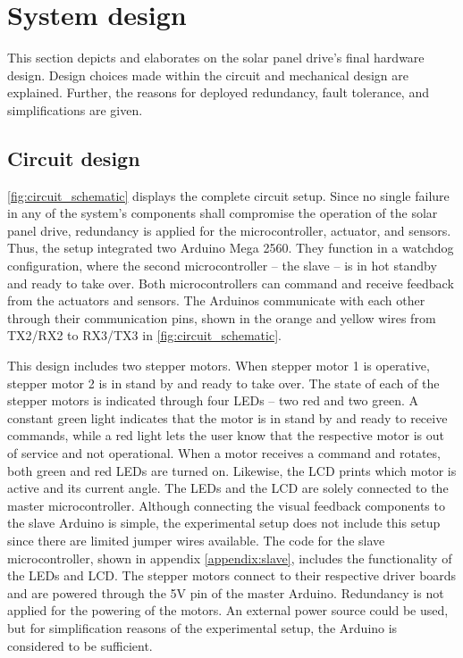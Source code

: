 \section{System design}
This section depicts and elaborates on the solar panel drive's final hardware design. Design choices made within the circuit and mechanical design are explained. Further, the reasons for deployed redundancy, fault tolerance, and simplifications are given.

\subsection{Circuit design}
\autoref{fig:circuit_schematic} displays the complete circuit setup.
Since no single failure in any of the system's components shall compromise the operation of the solar panel drive, redundancy is applied for the microcontroller, actuator, and sensors. Thus, the setup integrated two Arduino Mega 2560. They function in a watchdog configuration, where the second microcontroller -- the slave -- is in hot standby and ready to take over. Both microcontrollers can command and receive feedback from the actuators and sensors. The Arduinos communicate with each other through their communication pins, shown in the orange and yellow wires from TX2/RX2 to RX3/TX3 in \autoref{fig:circuit_schematic}. 

This design includes two stepper motors. When stepper motor 1 is operative, stepper motor 2 is in stand by and ready to take over. The state of each of the stepper motors is indicated through four LEDs -- two red and two green. A constant green light indicates that the motor is in stand by and ready to receive commands, while a red light lets the user know that the respective motor is out of service and not operational. When a motor receives a command and rotates, both green and red LEDs are turned on. Likewise, the LCD prints which motor is active and its current angle. The LEDs and the LCD are solely connected to the master microcontroller. Although connecting the visual feedback components to the slave Arduino is simple, the experimental setup does not include this setup since there are limited jumper wires available. The code for the slave microcontroller, shown in appendix \ref{appendix:slave}, includes the functionality of the LEDs and LCD. The stepper motors connect to their respective driver boards and are powered through the 5V pin of the master Arduino. Redundancy is not applied for the powering of the motors. An external power source could be used, but for simplification reasons of the experimental setup, the Arduino is considered to be sufficient.


